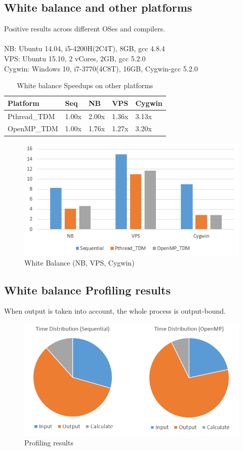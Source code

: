 \documentclass{acm_proc_article-sp}
\begin{document}
\subsection{White balance and other platforms}
Positive results across different OSes and compilers. \\ \\
NB: Ubuntu 14.04, i5-4200H(2C4T), 8GB, gcc 4.8.4 \\
VPS: Ubuntu 15.10, 2 vCores, 2GB, gcc 5.2.0 \\
Cygwin: Windows 10, i7-3770(4C8T), 16GB, Cygwin-gcc 5.2.0
\begin{table}[H]
\centering
\caption{White balance Speedups on other platforms}
\begin{tabular}{|l|l|l|l|l|} \hline
Platform&Seq&NB&VPS&Cygwin\\ \hline
Pthread\_TDM & 1.00x & 2.00x & 1.36x & 3.13x \\ \hline
OpenMP\_TDM & 1.00x & 1.76x & 1.27x & 3.20x \\ \hline
\end{tabular}
\end{table}
\begin{figure}[H]
  \includegraphics[width=\linewidth,natwidth=473,natheight=247]{white_platforms.png}
  \caption{White Balance (NB, VPS, Cygwin)}
  \label{fig:white_platforms}
\end{figure}

\subsection{White balance Profiling results}
When output is taken into account, the whole process is output-bound.
\begin{figure}[H]
  \includegraphics[width=\linewidth,natwidth=757,natheight=395]{profile.png}
  \caption{Profiling results}
  \label{fig:profile}
\end{figure}
\end{document}
